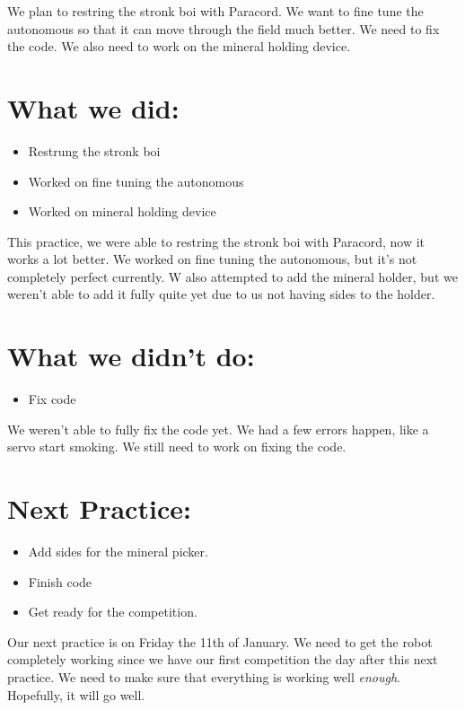 \documentclass[12pt]{article}
\begin{document}
We plan to restring the stronk boi with Paracord. We want to fine tune the autonomous so that it can move through the field much better. We need to fix the code. We also need to work on the mineral holding device.

\section{What we did:}
\begin{itemize}
	\item Restrung the stronk boi
	\item Worked on fine tuning the autonomous
	\item Worked on mineral holding device
\end{itemize}

This practice, we were able to restring the stronk boi with Paracord, now it works a lot better. We worked on fine tuning the autonomous, but it's not completely perfect currently. W also attempted to add the mineral holder, but we weren't able to add it fully quite yet due to us not having sides to the holder.

\section{What we didn't do:}
\begin{itemize}
	\item Fix code
\end{itemize}

We weren't able to fully fix the code yet. We had a few errors happen, like a servo start smoking. We still need to work on fixing the code.

\section{Next Practice:}
\begin{itemize}
	\item Add sides for the mineral picker.
	\item Finish code
	\item Get ready for the competition.
\end{itemize}

Our next practice is on Friday the 11th of January. We need to get the robot completely working since we have our first competition the day after this next practice. We need to make sure that everything is working well \textit{enough}. Hopefully, it will go well.
\end{document}
